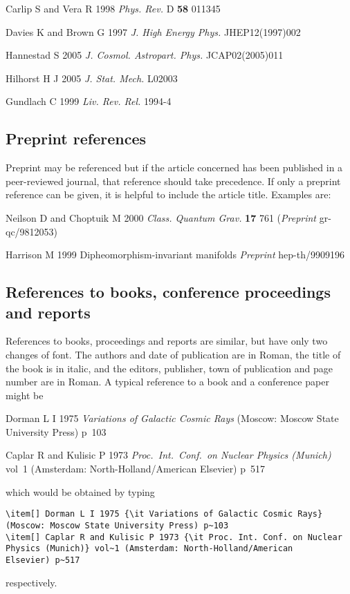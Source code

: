 \documentclass[12pt]{iopart}
\begin{document}
\item Carlip S and Vera R 1998 {\it Phys. Rev.} D {\bf 58} 011345 
\item Davies K and Brown G 1997 {\it J. High Energy Phys.} JHEP12(1997)002
\item Hannestad S 2005 {\it J. Cosmol. Astropart. Phys.} JCAP02(2005)011
\item Hilhorst H J 2005 {\it J. Stat. Mech.} L02003
\item Gundlach C 1999 {\it Liv. Rev. Rel.} 1994-4
\endnumrefs

\subsection{Preprint references}
Preprint may be referenced but if the article concerned has been published in a peer-reviewed journal, that reference should take precedence. If only a preprint reference can be given, it is helpful to include the article title. Examples are:
\vskip6pt
\item Neilson D and Choptuik M 2000 {\it Class. Quantum Grav.} {\bf 17} 761 ({\it Preprint} gr-qc/9812053)
\item Harrison M 1999 Dipheomorphism-invariant manifolds {\it Preprint} hep-th/9909196
\endnumrefs

\subsection{References to books, conference proceedings and reports}

References to books, proceedings and reports are similar, but have only two
changes of font. The authors and date of publication are in Roman, the 
title of the book is in italic, and the editors, publisher, 
town of publication 
and page number are in Roman. A typical reference to a book and a
conference paper might be

\smallskip
\begin{harvard}
\item[] Dorman L I 1975 {\it Variations of Galactic Cosmic Rays} 
(Moscow: Moscow State University Press) p~103
\item[] Caplar R and Kulisic P 1973 {\it Proc.\
Int.\ Conf.\ on Nuclear Physics (Munich)} vol~1 (Amsterdam:  
North-Holland/American Elsevier) p~517
\end{harvard}
\smallskip

\noindent which would be obtained by typing
\small\begin{verbatim}
\item[] Dorman L I 1975 {\it Variations of Galactic Cosmic Rays} 
(Moscow: Moscow State University Press) p~103
\item[] Caplar R and Kulisic P 1973 {\it Proc. Int. Conf. on Nuclear 
Physics (Munich)} vol~1 (Amsterdam: North-Holland/American 
Elsevier) p~517
\end{verbatim}\normalsize
\noindent respectively.
\end{document}
